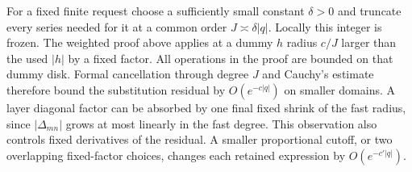 For a fixed finite request choose a sufficiently small constant
$\delta>0$ and truncate every series needed for it at a common order
$J\asymp\delta|q|$.  Locally this integer is frozen.  The weighted
proof above applies at a dummy $h$ radius $c/J$ larger than the used
$|h|$ by a fixed factor.  All operations in the proof are bounded on
that dummy disk.  Formal cancellation through degree $J$ and Cauchy's
estimate therefore bound the substitution residual by
$O(e^{-c|q|})$ on smaller domains.  A layer diagonal factor can be
absorbed by one final fixed shrink of the fast radius, since
$|\Delta_{mn}|$ grows at most linearly in the fast degree.  This observation
also controls fixed derivatives of the residual.  A smaller
proportional cutoff, or two overlapping fixed-factor choices, changes
each retained expression by $O(e^{-c'|q|})$.

